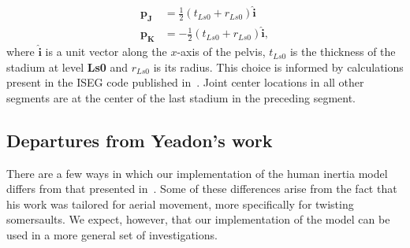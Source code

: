 \documentclass[10pt,a4paper,twocolumn]{article}
\begin{document}
\begin{align}
    \mathbf{p_J} &= \frac{1}{2} (t_{Ls0} + r_{Ls0})\hat{\mathbf{i}} \\
    \mathbf{p_K} &= -\frac{1}{2} (t_{Ls0} + r_{Ls0})\hat{\mathbf{i}},
\end{align}
where $\hat{\mathbf{i}}$ is a unit vector along the $x$-axis of the pelvis,
$t_{Ls0}$ is the thickness of the stadium at level \textbf{Ls0} and $r_{Ls0}$
is its radius. This choice is informed by calculations present in the ISEG code
published in~\cite{Yeadon1984a}. Joint center locations in all other
segments are at the center of the last stadium in the preceding segment.

\subsection*{Departures from Yeadon's work}

There are a few ways in which our implementation of the human inertia model
differs from that presented in~\cite{Yeadon1990c, Yeadon1990f,
Yeadon1990e, Yeadon1990d}. Some of these differences arise from the fact that
his work was tailored for aerial movement, more specifically for twisting
somersaults. We expect, however, that our implementation of the model can be
used in a more general set of investigations.
\end{document}
